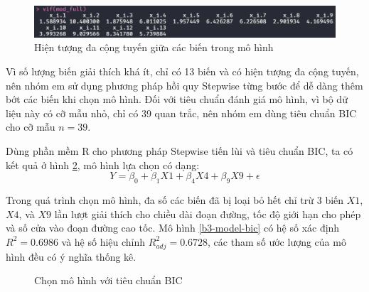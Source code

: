\begin{figure}[H]
	\centering
	\includegraphics[width=0.8\linewidth]{images/B3/model-full-vif}
	\caption{Hiện tượng đa cộng tuyến giữa các biến trong mô hình}
	\label{fig-b3:model-full-vif}
\end{figure}

Vì số lượng biến giải thích khá ít, chỉ có 13 biến và có hiện tượng đa cộng tuyến, nên nhóm em sử dụng phương pháp hồi quy Stepwise từng bước để dễ dàng thêm bớt các biến khi chọn mô hình. Đối với tiêu chuẩn đánh giá mô hình, vì bộ dữ liệu này có cỡ mẫu nhỏ, chỉ có 39 quan trắc, nên nhóm em dùng tiêu chuẩn BIC cho cỡ mẫu $n=39$.

Dùng phần mềm R cho phương pháp Stepwise tiến lùi và tiêu chuẩn BIC, ta có kết quả ở hình \ref{fig-b3:model-bic}, mô hình lựa chọn có dạng:
\begin{equation}\label{b3-model-bic}
	Y = \beta_0 + \beta_1X1 + \beta_4X4 + \beta_9X9 + \epsilon
\end{equation}

Trong quá trình chọn mô hình, đa số các biến đã bị loại bỏ hết chỉ trừ 3 biến $X1$, $X4$, và $X9$ lần lượt giải thích cho chiều dài đoạn đường, tốc độ giới hạn cho phép và số cửa vào đoạn đường cao tốc. Mô hình \ref{b3-model-bic} có hệ số xác định $R^2 = 0.6986$ và hệ số hiệu chỉnh $R^2_{adj} = 0.6728$, các tham số ước lượng của mô hình đều có ý nghĩa thống kê. 

\begin{figure}[H]
	\centering
	\hfill
	\caption{Chọn mô hình với tiêu chuẩn BIC}
	\label{fig-b3:model-bic}
\end{figure}

